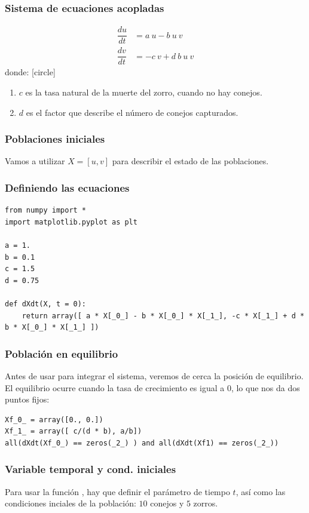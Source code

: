 \begin{frame}
\frametitle{Sistema de ecuaciones acopladas}
\begin{align*}
\dfrac{du}{dt} &= a \: u - b \: u \: v \\
\dfrac{dv}{dt} &= -c \: v + d \: b\: u\: v
\end{align*}
donde:
[circle]
\begin{enumerate}[<+->]
\conti
\item $c$ es la tasa natural de la muerte del zorro, cuando no hay conejos.
\item $d$ es el factor que describe el número de conejos capturados.
\end{enumerate}
\end{frame}
\begin{frame}
\frametitle{Poblaciones iniciales}
Vamos a utilizar $X = [u, v]$ para describir el estado de las poblaciones.
\end{frame}
\begin{frame}
\frametitle{Definiendo las ecuaciones}
\begin{lstlisting}[caption=Código inicial, style=FormattedNumber, basicstyle=\linespread{1.1}\ttfamily=\small, columns=fullflexible]
from numpy import *
import matplotlib.pyplot as plt

a = 1.
b = 0.1
c = 1.5
d = 0.75

def dXdt(X, t = 0):
    return array([ a * X[_0_] - b * X[_0_] * X[_1_], -c * X[_1_] + d * b * X[_0_] * X[_1_] ])
\end{lstlisting}
\end{frame}
\begin{frame}
\frametitle{Población en equilibrio}
Antes de usar  para integrar el sistema, veremos de cerca la posición de equilibrio.
\\
\bigskip
El equilibrio ocurre cuando la tasa de crecimiento es igual a $0$, lo que nos da dos puntos fijos:
\begin{lstlisting}[caption=Equilibrio en las poblaciones, style=FormattedNumber, basicstyle=\linespread{1.1}\ttfamily=\small, columns=fullflexible]
Xf_0_ = array([0., 0.])
Xf_1_ = array([ c/(d * b), a/b])
all(dXdt(Xf_0_) == zeros(_2_) ) and all(dXdt(Xf1) == zeros(_2_))
\end{lstlisting}
\end{frame}
\begin{frame}[fragile]
\frametitle{Variable temporal y cond. iniciales}
Para usar la función , hay que definir el parámetro de tiempo $t$, así como las condiciones inciales de la población: $10$ conejos y $5$ zorros.
\end{frame}
